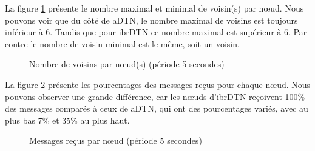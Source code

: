 \documentclass[a4paper,10pt]{article}
\begin{document}
La figure \ref{fig:05_nb_neighbors} présente le nombre maximal et minimal de voisin(s) par nœud. Nous pouvons voir que du côté de aDTN, le nombre maximal de voisins est toujours inférieur à 6. Tandis que pour ibrDTN ce nombre maximal est supérieur à 6. Par contre le nombre de voisin minimal est le même, soit un voisin.\par

\begin{figure}[h!]
    \centering
    \caption{Nombre de voisins par nœud(s) (période 5 secondes)}
    \label{fig:05_nb_neighbors}
\end{figure}

La figure \ref{fig:05_msg_rcv} présente les pourcentages des messages reçus pour chaque nœud. Nous pouvons observer une grande différence, car les nœuds d’ibrDTN reçoivent 100\% des messages comparés à ceux de aDTN, qui ont des pourcentages variés, avec au plus bas 7\% et 35\% au plus haut.\par

\begin{figure}[h!]
    \centering
    \caption{Messages reçus par nœud (période 5 secondes)}
    \label{fig:05_msg_rcv}
\end{figure}
\end{document}
